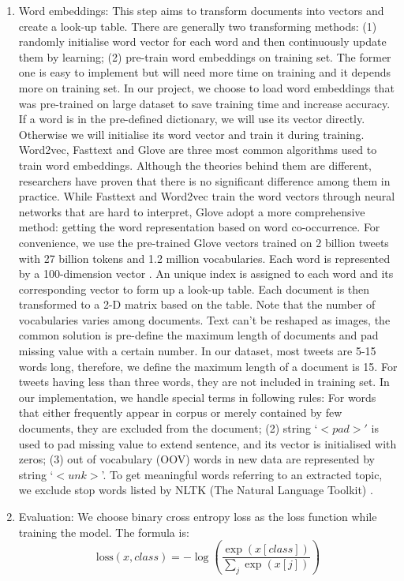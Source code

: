 \begin{enumerate}
    \item Word embeddings: This step aims to transform documents into vectors and create a look-up table. There are generally two transforming methods: (1) randomly initialise word vector for each word and then continuously update them by learning; (2) pre-train word embeddings on training set. The former one is easy to implement but will need more time on training and it depends more on training set. In our project, we choose to load word embeddings that was pre-trained on large dataset to save training time and increase accuracy. If a word is in the pre-defined dictionary, we will use its vector directly. Otherwise we will initialise its word vector and train it during training. Word2vec\cite{mikolov2013efficient}, Fasttext\cite{joulin2016bag} and Glove \cite{pennington2014glove} are three most common algorithms used to train word embeddings. Although the theories behind them are different, researchers have proven that there is no significant difference among them in practice. While Fasttext and Word2vec train the word vectors through neural networks that are hard to interpret, Glove adopt a more comprehensive method: getting the word representation based on word co-occurrence. For convenience, we use the pre-trained Glove vectors trained on 2 billion tweets with 27 billion tokens and 1.2 million vocabularies. Each word is represented by a 100-dimension vector \cite{pennington2014glove}. An unique index is assigned to each word and its corresponding vector to form up a look-up table. Each document is then transformed to a 2-D matrix based on the table. Note that the number of vocabularies varies among documents. Text can't be reshaped as images, the common solution is pre-define the maximum length of documents and pad missing value with a certain number. In our dataset, most tweets are 5-15 words long, therefore, we define the maximum length of a document is 15. For tweets having less than three words, they are not included in training set. In our implementation, we handle special terms in following rules: For words that either frequently appear in corpus or merely contained by few documents, they are excluded from the document; (2) string `$<pad>'$ is used to pad missing value to extend sentence, and its vector is initialised with zeros; (3) out of vocabulary (OOV) words in new data are represented by string `$<unk>$'. To get meaningful words referring to an extracted topic, we exclude stop words listed by NLTK (The Natural Language Toolkit) \cite{journals/corr/cs-CL-0205028}.
    \item Evaluation: We choose binary cross entropy loss as the loss function while training the model. The formula is: $$\text{loss}(x, class) = -\log\left(\frac{\exp(x[class])}{\sum_j \exp(x[j])}\right)
$$
\end{enumerate}
